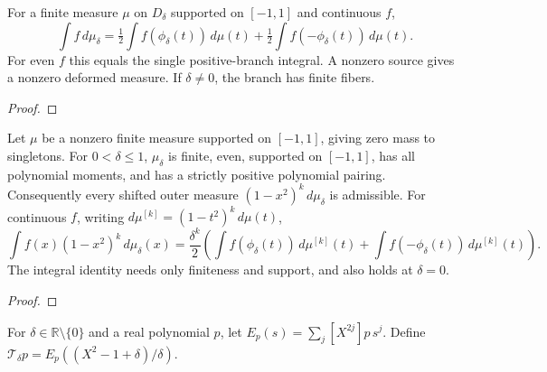 \begin{supporting}
\begin{theorem}
\label{thm:disk-deformation-characterisation}
\leanok
For a finite measure $\mu$ on $D_\delta$ supported on $[-1,1]$ and continuous $f$,
\[
\int f\,d\mu_\delta=\tfrac12\int f(\phi_\delta(t))\,d\mu(t)
+\tfrac12\int f(-\phi_\delta(t))\,d\mu(t).
\]
For even $f$ this equals the single positive-branch integral. A nonzero source gives a nonzero deformed measure.
If $\delta\ne0$, the branch has finite fibers.
\end{theorem}
\begin{proof}
\leanok
\end{proof}

\begin{theorem}
\label{thm:disk-deformation-admissible}
\leanok
Let $\mu$ be a nonzero finite measure supported on $[-1,1]$, giving zero mass to
singletons. For $0<\delta\le1$, $\mu_\delta$ is finite, even, supported on $[-1,1]$,
has all polynomial moments, and has a strictly positive polynomial pairing.
Consequently every shifted outer measure $(1-x^2)^k\,d\mu_\delta$ is admissible.
For continuous $f$, writing $d\mu^{[k]}=(1-t^2)^k\,d\mu(t)$,
\[
 \int f(x)(1-x^2)^k\,d\mu_\delta(x)
 =\frac{\delta^k}{2}\left(\int f(\phi_\delta(t))\,d\mu^{[k]}(t)
 +\int f(-\phi_\delta(t))\,d\mu^{[k]}(t)\right).
\]
The integral identity needs only finiteness and support, and also holds at $\delta=0$.
\end{theorem}
\begin{proof}
\leanok
\end{proof}

\begin{definition}
\label{def:even-disk-transport}
\leanok
For $\delta\in\mathbb R\setminus\{0\}$ and a real polynomial $p$, let
$E_p(s)=\sum_j[X^{2j}]p\,s^j$. Define
$\mathcal T_\delta p=E_p((X^2-1+\delta)/\delta)$.


\end{definition}
\end{supporting}
